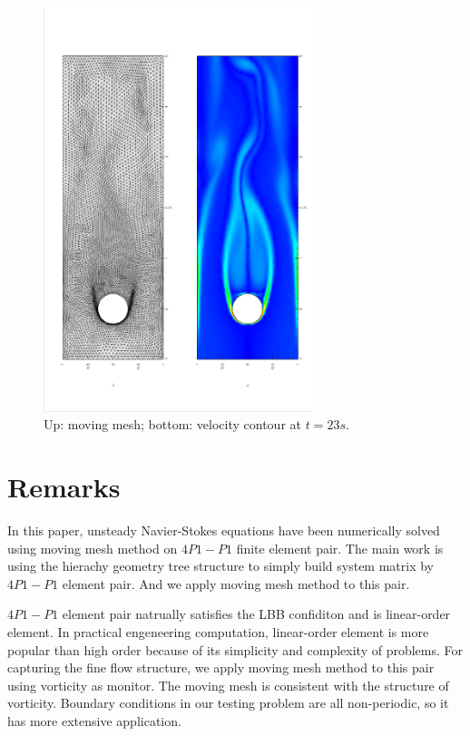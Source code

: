 \documentclass[a4paper, 11pt]{article}
\begin{document}
    \begin{figure}[!htbp]
        \centering
        \includegraphics[width = 0.7\textwidth, angle = -90]{picture/obstacle_flow_data/mesh_t_23s.eps}
        \caption{\small Up: moving mesh; bottom: velocity contour at
          $t = 23s$.}
        \label{fig::cylinder_mesh_t23s}
      \end{figure}


   \section{Remarks}

   In this paper, unsteady Navier-Stokes equations have been numerically 
   solved using moving mesh method on $4P1-P1$ finite element
   pair. The main work is using the hierachy geometry tree structure
   to simply build system matrix by $4P1-P1$ element pair. And we
   apply moving mesh method to this pair. 
    
   $4P1-P1$ element pair natrually satisfies the LBB confiditon and is
   linear-order element. In practical engeneering computation,
   linear-order element is more popular than high order because of its
   simplicity and complexity of problems. For capturing the fine flow
   structure, we apply moving mesh method to this pair using vorticity
   as monitor. The moving mesh is consistent with the structure of
   vorticity. Boundary conditions in our testing problem are all
   non-periodic, so it has more extensive application.
   
\end{document}
